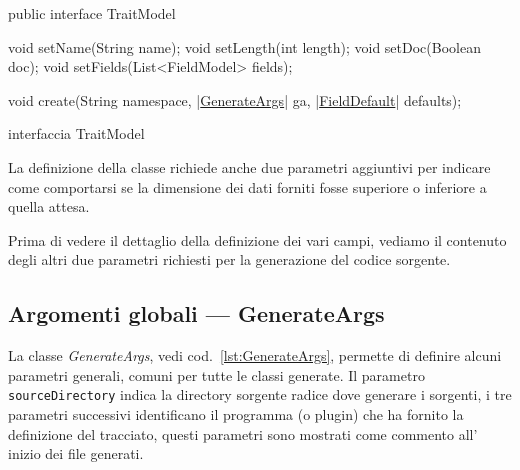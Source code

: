 \documentclass[a4paper,10pt]{report}
\newif\ifesource
\newenvironment{elisting}[1][H]
  {\captionsetup{aboveskip=0pt}\begin{listing}[#1]}
  {\end{listing}%
}
\begin{document}
\ifesource
\begin{figure*}[!htb]
\begin{lstlisting}[language=java, caption=interfaccia TraitModel, 
label=lst:TraitModel]
public interface TraitModel {
    void setName(String name);
    void setLength(int length);
    void setDoc(Boolean doc);
    void setFields(List<FieldModel> fields);

    void create(String namespace, (*\hyperref[lst:GenerateArgs]{GenerateArgs}*) ga, (*\hyperref[lst:FieldDefault]{FieldDefault}*) defaults);
}
\end{lstlisting}\index{TraitModel}
\end{figure*}
\else
\begin{elisting}[!htb]
\begin{javacode}
public interface TraitModel {
    void setName(String name);
    void setLength(int length);
    void setDoc(Boolean doc);
    void setFields(List<FieldModel> fields);

    void create(String namespace, |\hyperref[lst:GenerateArgs]{GenerateArgs}| ga, |\hyperref[lst:FieldDefault]{FieldDefault}| defaults);
}
\end{javacode}
\caption{interfaccia TraitModel}
\label{lst:TraitModel}
\end{elisting}
\fi
La definizione della classe richiede anche due parametri aggiuntivi per indicare
come comportarsi se la dimensione dei dati forniti fosse superiore o inferiore a
quella attesa.

Prima di vedere il dettaglio della definizione dei vari campi, vediamo il 
contenuto degli altri due parametri richiesti per la generazione del codice
sorgente.

\subsection{Argomenti globali --- GenerateArgs}
La classe \textsl{GenerateArgs}, vedi cod.~\ref{lst:GenerateArgs}, permette di
definire alcuni parametri generali, comuni per tutte le classi generate.
Il parametro \texttt{sourceDirectory} indica la directory sorgente radice dove 
generare i sorgenti, i tre parametri successivi identificano il programma 
(o plugin) che ha fornito la definizione del tracciato, questi parametri sono 
mostrati come commento all'\,inizio dei file generati.
\end{document}
